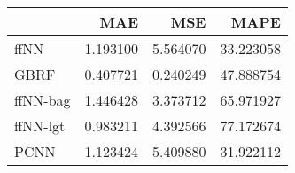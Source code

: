 \begin{tabular}{lrrr}
\toprule
{} &       MAE &       MSE &       MAPE \\
\midrule
ffNN     &  1.193100 &  5.564070 &  33.223058 \\
GBRF     &  0.407721 &  0.240249 &  47.888754 \\
ffNN-bag &  1.446428 &  3.373712 &  65.971927 \\
ffNN-lgt &  0.983211 &  4.392566 &  77.172674 \\
PCNN     &  1.123424 &  5.409880 &  31.922112 \\
\bottomrule
\end{tabular}

